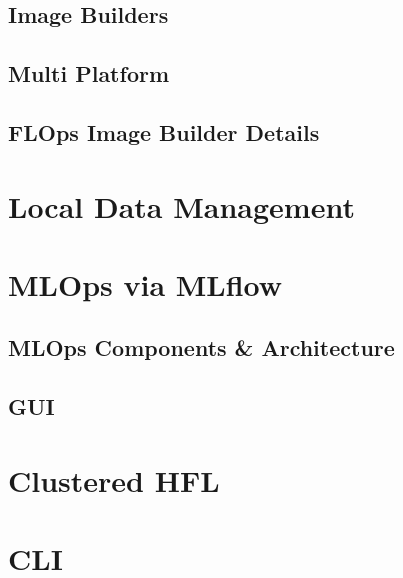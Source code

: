     \subsection{Image Builders}

    \subsection{Multi Platform}

    \subsection{FLOps Image Builder Details}

\section{Local Data Management}

\section{MLOps via MLflow}

    \subsection{MLOps Components \& Architecture}

    \subsection{GUI}

\section{Clustered HFL}

\section{CLI}

